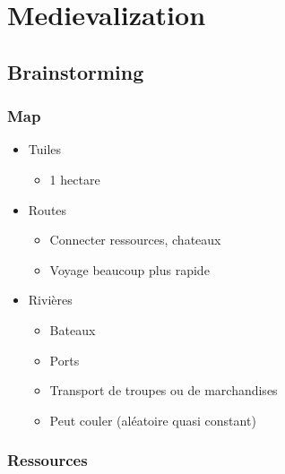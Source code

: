 \documentclass[
]{article}
\author{}
\date{}
\providecommand{\tightlist}{%
  \setlength{\itemsep}{0pt}\setlength{\parskip}{0pt}}
\begin{document}
\hypertarget{medievalization}{%
\section{Medievalization}\label{medievalization}}

\hypertarget{brainstorming}{%
\subsection{Brainstorming}\label{brainstorming}}

\hypertarget{map}{%
\subsubsection{Map}\label{map}}

\begin{itemize}
\tightlist
\item
  Tuiles

  \begin{itemize}
  \tightlist
  \item
    1 hectare
  \end{itemize}
\item
  Routes

  \begin{itemize}
  \tightlist
  \item
    Connecter ressources, chateaux
  \item
    Voyage beaucoup plus rapide
  \end{itemize}
\item
  Rivières

  \begin{itemize}
  \tightlist
  \item
    Bateaux
  \item
    Ports
  \item
    Transport de troupes ou de marchandises
  \item
    Peut couler (aléatoire quasi constant)
  \end{itemize}
\end{itemize}

\hypertarget{ressources}{%
\subsubsection{Ressources}\label{ressources}}
\end{document}
